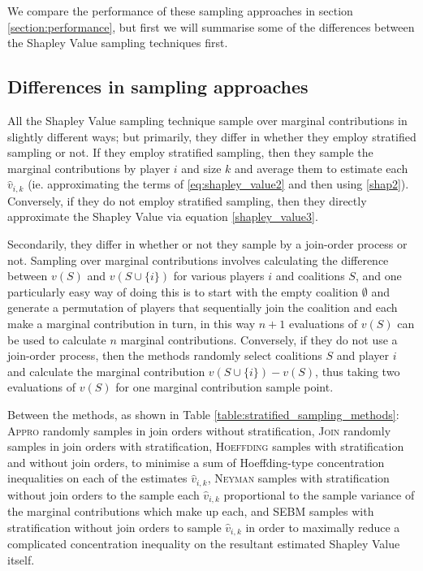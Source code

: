 We compare the performance of these sampling approaches in section \ref{section:performance}, but first we will summarise some of the differences between the Shapley Value sampling techniques first.

\subsection{Differences in sampling approaches}

All the Shapley Value sampling technique sample over marginal contributions in slightly different ways; but primarily, they differ in whether they employ stratified sampling or not.
If they employ stratified sampling, then they sample the marginal contributions by player $i$ and size $k$ and average them to estimate each $\hat{v}_{i,k}$ (ie. approximating the terms of \eqref{eq:shapley_value2} and then using \eqref{shap2}).
Conversely, if they do not employ stratified sampling, then they directly approximate the Shapley Value via equation \eqref{shapley_value3}.

Secondarily, they differ in whether or not they sample by a join-order process or not. Sampling over marginal contributions involves calculating the difference between $v(S)$ and $v(S\cup\{i\})$ for various players $i$ and coalitions $S$, and one particularly easy way of doing this is to start with the empty coalition $\emptyset$ and generate a permutation of players that sequentially join the coalition and each make a marginal contribution in turn, in this way $n+1$ evaluations of $v(S)$ can be used to calculate $n$ marginal contributions.
Conversely, if they do not use a join-order process, then the methods randomly select coalitions $S$ and player $i$ and calculate the marginal contribution $v(S\cup\{i\}) - v(S)$, thus taking two evaluations of $v(S)$ for one marginal contribution sample point.

Between the methods, as shown in Table \ref{table:stratified_sampling_methods}: \textsc{Appro} randomly samples in join orders without stratification, \textsc{Join} randomly samples in join orders with stratification, \textsc{Hoeffding} samples with stratification and without join orders, to minimise a sum of Hoeffding-type concentration inequalities on each of the estimates $\hat{v}_{i,k}$,
\textsc{Neyman} samples with stratification without join orders to the sample each $\hat{v}_{i,k}$ proportional to the sample variance of the marginal contributions which make up each,
and \textsc{SEBM} samples with stratification without join orders to sample $\hat{v}_{i,k}$ in order to maximally reduce a complicated concentration inequality on the resultant estimated Shapley Value itself.

